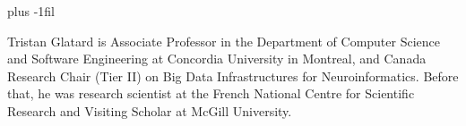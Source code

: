 \documentclass[10pt,journal,compsoc]{IEEEtran}
\begin{document}
\baselineskip plus -1fil
\begin{IEEEbiography}{Tristan
        Glatard} is Associate Professor in the Department of Computer Science and
    Software Engineering at Concordia University in Montreal, and Canada
    Research Chair (Tier II) on Big Data Infrastructures for Neuroinformatics.
    Before that, he was research scientist at the French National Centre for
    Scientific Research and Visiting Scholar at McGill University. 
\end{IEEEbiography}






% 

\end{document}
